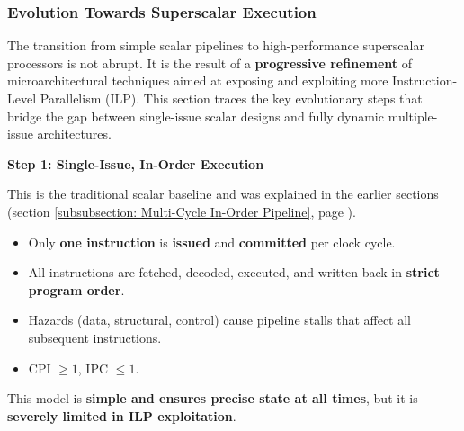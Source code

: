 \subsubsection{Evolution Towards Superscalar Execution}

The transition from simple scalar pipelines to high-performance superscalar processors is not abrupt. It is the result of a \textbf{progressive refinement} of microarchitectural techniques aimed at exposing and exploiting more Instruction-Level Parallelism (ILP). This section traces the key evolutionary steps that bridge the gap between single-issue scalar designs and fully dynamic multiple-issue architectures.

\highspace
\begin{flushleft}
    \textcolor{Red2}{ \textbf{Step 1: Single-Issue, In-Order Execution}}
\end{flushleft}
This is the traditional scalar baseline and was explained in the earlier sections (section \ref{subsubsection: Multi-Cycle In-Order Pipeline}, page \pageref{subsubsection: Multi-Cycle In-Order Pipeline}).
\begin{itemize}
    \item Only \textbf{one instruction} is \textbf{issued} and \textbf{committed} per clock cycle.
    \item All instructions are fetched, decoded, executed, and written back in \textbf{strict program order}.
    \item Hazards (data, structural, control) cause pipeline stalls that affect all subsequent instructions.
    \item CPI $\ge 1$, IPC $\le 1$.
\end{itemize}
This model is \textcolor{Green3}{\textbf{simple and ensures precise state at all times}}, but it is \textcolor{Red2}{\textbf{severely limited in ILP exploitation}}.

